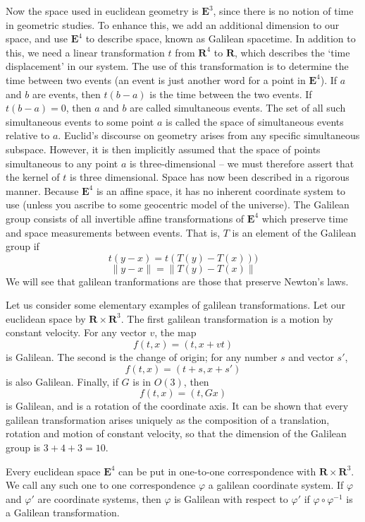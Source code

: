Now the space used in euclidean geometry is $\mathbf{E}^3$, since there is no notion of time in geometric studies. To enhance this, we add an additional dimension to our space, and use $\mathbf{E}^4$ to describe space, known as Galilean spacetime. In addition to this, we need a linear transformation $t$ from $\mathbf{R}^4$ to $\mathbf{R}$, which describes the `time displacement' in our system. The use of this transformation is to determine the time between two events (an event is just another word for a point in $\mathbf{E}^4$). If $a$ and $b$ are events, then $t(b - a)$ is the time between the two events. If $t(b - a) = 0$, then $a$ and $b$ are called simultaneous events. The set of all such simultaneous events to some point $a$ is called the space of simultaneous events relative to $a$. Euclid's discourse on geometry arises from any specific simultaneous subspace. However, it is then implicitly assumed that the space of points simultaneous to any point $a$ is three-dimensional -- we must therefore assert that the kernel of $t$ is three dimensional. Space has now been described in a rigorous manner.
%
Because $\mathbf{E}^4$ is an affine space, it has no inherent coordinate system to use (unless you ascribe to some geocentric model of the universe). The Galilean group consists of all invertible affine transformations of $\mathbf{E}^4$ which preserve time and space measurements between events. That is, $T$ is an element of the Galilean group if
%
\[ t(y - x) = t(T(y) - T(x))) \]
%
\[ \| y - x \| = \| T(y) - T(x) \| \]
%
We will see that galilean tranformations are those that preserve Newton's laws.

Let us consider some elementary examples of galilean transformations. Let our euclidean space by $\mathbf{R} \times \mathbf{R}^3$. The first galilean transformation is a motion by constant velocity. For any vector $v$, the map
%
\[ f(t,x) = (t,x + vt) \]
%
is Galilean. The second is the change of origin; for any number $s$ and vector $s'$,
%
\[ f(t,x) = (t + s, x + s') \]
%
is also Galilean. Finally, if $G$ is in $O(3)$, then
%
\[ f(t,x) = (t, Gx) \]
%
is Galilean, and is a rotation of the coordinate axis. It can be shown that every galilean transformation arises uniquely as the composition of a translation, rotation and motion of constant velocity, so that the dimension of the Galilean group is $3 + 4 + 3 = 10$.

Every euclidean space $\mathbf{E}^4$ can be put in one-to-one correspondence with $\mathbf{R} \times \mathbf{R}^3$. We call any such one to one correspondence $\varphi$ a galilean coordinate system. If $\varphi$ and $\varphi'$ are coordinate systems, then $\varphi$ is Galilean with respect to $\varphi'$ if $\varphi \circ \varphi^{-1}$ is a Galilean transformation.

